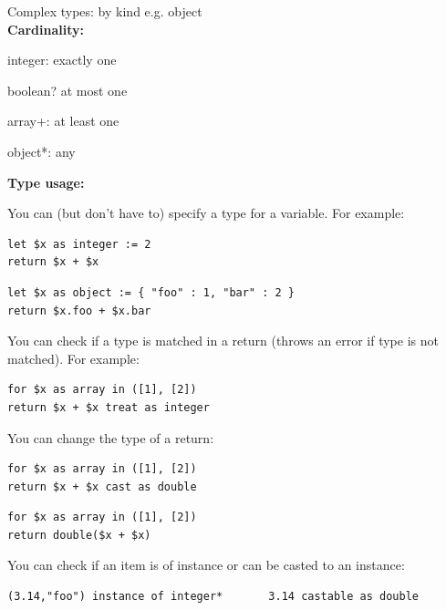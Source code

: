 \documentclass[11pt,oneside,a4paper]{article}
\begin{document}
{Complex types: by kind e.g. object\\

\textbf{Cardinality:}
\begin{compactitem}
\item integer: exactly one
\item boolean? at most one
\item array+: at least one
\item object*: any\\
\end{compactitem}

\textbf{Type usage:} 

You can (but don't have to) specify a type for a variable. For example:

\begin{minipage}{.45\textwidth}
\begin{lstlisting}
let $x as integer := 2
return $x + $x
\end{lstlisting}
\end{minipage}\hfill
\begin{minipage}{.45\textwidth}
\begin{lstlisting}
let $x as object := { "foo" : 1, "bar" : 2 }
return $x.foo + $x.bar
\end{lstlisting}
\end{minipage}

You can check if a type is matched in a return (throws an error if type is not matched). For example:
\begin{lstlisting}
for $x as array in ([1], [2])
return $x + $x treat as integer
\end{lstlisting}

You can change the type of a return:

\begin{minipage}{.45\textwidth}
\begin{lstlisting}
for $x as array in ([1], [2])
return $x + $x cast as double
\end{lstlisting}
\end{minipage}\hfill
\begin{minipage}{.45\textwidth}
\begin{lstlisting}
for $x as array in ([1], [2])
return double($x + $x)
\end{lstlisting}
\end{minipage}


You can check if an item is of instance or can be casted to an instance:
\begin{lstlisting}
(3.14,"foo") instance of integer*		3.14 castable as double
\end{lstlisting}

}
\end{document}

